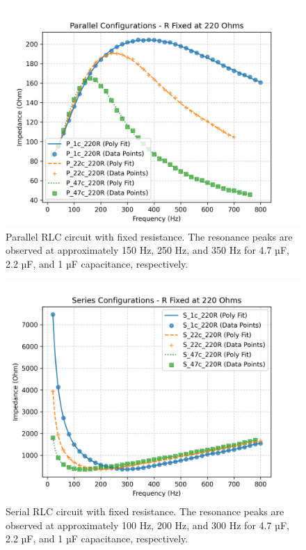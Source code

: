 \documentclass[journal]{IEEEtran}
\begin{document}
\begin{figure}[H]
    \centering
    \includegraphics[width=\linewidth]{output_plots/Fixed_R/Parallel.png}
    \caption{Parallel RLC circuit with fixed resistance. The resonance peaks are observed at approximately 150 Hz, 250 Hz, and 350 Hz for 4.7 µF, 2.2 µF, and 1 µF capacitance, respectively.}
    \label{fig:parallel_fixed_r}
\end{figure}

\begin{figure}[H]
    \centering
    \includegraphics[width=\linewidth]{output_plots/Fixed_R/Series.png}
    \caption{Serial RLC circuit with fixed resistance. The resonance peaks are observed at approximately 100 Hz, 200 Hz, and 300 Hz for 4.7 µF, 2.2 µF, and 1 µF capacitance, respectively.}
    \label{fig:series_fixed_r}
\end{figure}
\end{document}
